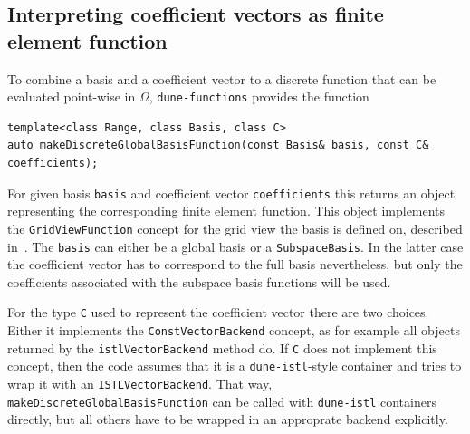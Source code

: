 \documentclass[a4paper,10pt,headings=normal,bibliography=totoc]{scrartcl}
\newcommand{\cpp}[1]{\lstinline[basicstyle=\ttfamily]!#1!}
\newcommand{\dunemodule}[1]{\texttt{#1}}
\begin{document}
\subsection{Interpreting coefficient vectors as finite element function}

To combine a basis and a coefficient vector to a discrete function that
can be evaluated point-wise in $\Omega$, \cpp{dune-functions} provides
the function
%
\begin{lstlisting}[style=Interface]
template<class Range, class Basis, class C>
auto makeDiscreteGlobalBasisFunction(const Basis& basis, const C& coefficients);
\end{lstlisting}
%
For given basis \cpp{basis} and coefficient vector \cpp{coefficients}
this returns an object representing the corresponding
finite element function. This object implements the \cpp{GridViewFunction}
concept for the grid view the basis is defined on, described in~\cite{engwer_graeser_muething_sander:2015}.
The \cpp{basis} can either be a global basis or
a \cpp{SubspaceBasis}.  In the latter case the coefficient
vector has to correspond to the full basis nevertheless, but only
the coefficients associated with the subspace basis functions
will be used.

For the type \cpp{C} used to represent the coefficient vector there are two choices.
Either it implements the \cpp{ConstVectorBackend} concept, as for example all objects
returned by the \cpp{istlVectorBackend} method do.  If \cpp{C} does not implement
this concept, then the code assumes that it is a \dunemodule{dune-istl}-style
container and tries to wrap it with an \cpp{ISTLVectorBackend}.
That way, \cpp{makeDiscreteGlobalBasisFunction} can be called with \dunemodule{dune-istl}
containers directly, but all others have to be wrapped in an approprate backend
explicitly.
\end{document}
